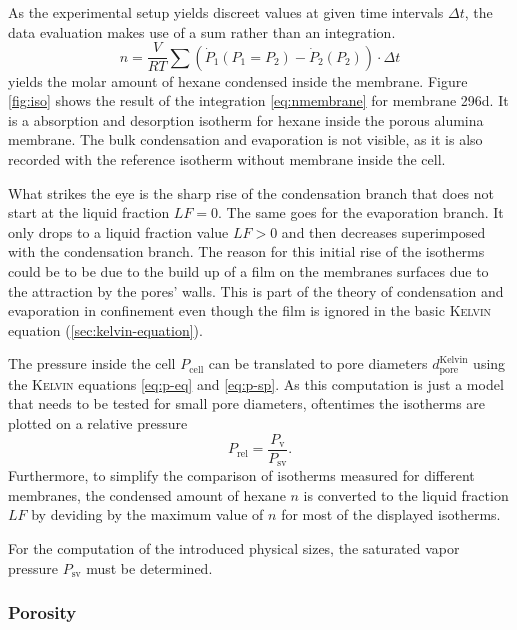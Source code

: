 \documentclass[../thesis.tex]{subfiles}
\begin{document}
      As the experimental setup yields discreet values at given time intervals $\Delta t$, the data evaluation makes use of a sum rather than an integration.
      \begin{equation}
          n = \frac{V}{RT} \sum \left( \dot{P}_1 ( P_1 = P_2) - \dot{P}_2(P_2) \right) \cdot \Delta t
          \label{eq:nmembrane}
      \end{equation}
      yields the molar amount of hexane condensed inside the membrane. Figure \cref{fig:iso} shows the result of the integration \cref{eq:nmembrane} for membrane 296d. It is a absorption and desorption isotherm for hexane inside the porous alumina membrane. The bulk condensation and evaporation is not visible, as it is also recorded with the reference isotherm without membrane inside the cell.

      What strikes the eye is the sharp rise of the condensation branch that does not start at the liquid fraction $LF=0$. The same goes for the evaporation branch. It only drops to a liquid fraction value $LF>0$ and then decreases superimposed with the condensation branch. The reason for this initial rise of the isotherms could be to be due to the build up of a film on the membranes surfaces due to the attraction by the pores' walls. This is part of the theory of condensation and evaporation in confinement even though the film is ignored in the basic \textsc{Kelvin} equation (\cref{sec:kelvin-equation}).
      \medskip

      The pressure inside the cell $P_\mathrm{cell}$ can be translated to pore diameters $d_\mathrm{pore}^\mathrm{Kelvin}$ using the \textsc{Kelvin} equations \cref{eq:p-eq} and \cref{eq:p-sp}. As this computation is just a model that needs to be tested for small pore diameters, oftentimes the isotherms are plotted on a relative pressure
      \begin{equation*}
        P_\mathrm{rel}=\frac{P_\mathrm{v}}{P_\mathrm{sv}}.
      \end{equation*}
      Furthermore, to simplify the comparison of isotherms measured for different membranes, the condensed amount of hexane $n$ is converted to the liquid fraction $LF$ by deviding by the maximum value of $n$ for most of the displayed isotherms.

      For the computation of the introduced physical sizes, the saturated vapor pressure $P_\mathrm{sv}$ must be determined.


      \subsubsection{Porosity}
      \label{sssec:porosity}
\end{document}
